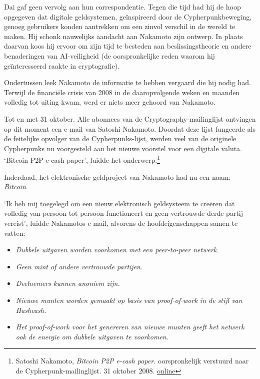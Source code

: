 \documentclass[
  a5paper,
  smalldemyvopaper,11pt,twoside,onecolumn,openright,extrafontsizes,
hidelinks]{memoir}
\renewenvironment{quote}%
               {\list{}{\rightmargin=.3cm\leftmargin=.3cm}%
                \itshape \item[]}%
               {\endlist}
\begin{document}
Dai gaf geen vervolg aan hun correspondentie. Tegen die tijd had hij de
hoop opgegeven dat digitale geldsystemen, geïnspireerd door de
Cypherpunkbeweging, genoeg gebruikers konden aantrekken om een zinvol
verschil in de wereld te maken. Hij schonk nauwelijks aandacht aan
Nakamoto zijn ontwerp. In plaats daarvan koos hij ervoor om zijn tijd te
besteden aan beslissingstheorie en andere benaderingen van AI-veiligheid
(de oorspronkelijke reden waarom hij geïnteresseerd raakte in
cryptografie).

Ondertussen leek Nakamoto de informatie te hebben vergaard die hij nodig
had. Terwijl de financiële crisis van 2008 in de daaropvolgende weken en
maanden volledig tot uiting kwam, werd er niets meer gehoord van
Nakamoto.

Tot en met 31 oktober. Alle abonnees van de Cryptography-mailinglijst
ontvingen op dit moment een e-mail van Satoshi Nakamoto. Doordat deze
lijst fungeerde als de feitelijke opvolger van de Cypherpunks-lijst,
werden veel van de originele Cypherpunks nu voorgesteld aan het nieuwe
voorstel voor een digitale valuta. `Bitcoin P2P e-cash paper', luidde
het onderwerp.\footnote{Satoshi Nakamoto, \emph{Bitcoin P2P e-cash
  paper.} oorspronkelijk verstuurd naar de Cypherpunk-mailinglijst. 31
  oktober 2008.
  \href{https://www.metzdowd.com/pipermail/cryptography/2008-October/014810.html}{online}}

Inderdaad, het elektronische geldproject van Nakamoto had nu een naam:
\emph{Bitcoin}.

`Ik heb mij toegelegd om een nieuw elektronisch geldsysteem te creëren
dat volledig van persoon tot persoon functioneert en geen vertrouwde
derde partij vereist', luidde Nakamotos e-mail, alvorens de
hoofdeigenschappen samen te vatten:

\begin{quote}
\begin{itemize}
\item
  \emph{Dubbele uitgaven worden voorkomen met een peer-to-peer netwerk.}
\item
  \emph{Geen mint of andere vertrouwde partijen.}
\item
  \emph{Deelnemers kunnen anoniem zijn.}
\item
  \emph{Nieuwe munten worden gemaakt op basis van proof-of-work in de
  stijl van Hashcash.}
\item
  \emph{Het proof-of-work voor het genereren van nieuwe munten geeft het
  netwerk ook de energie om dubbele uitgaven te voorkomen.}
\end{itemize}
\end{quote}
\end{document}
